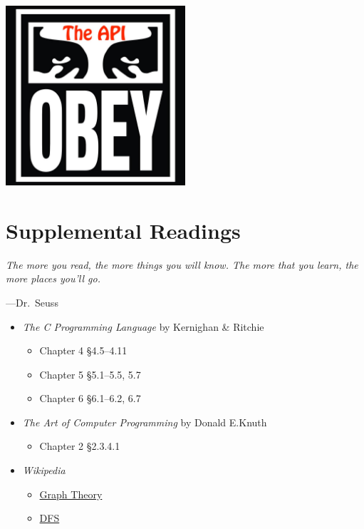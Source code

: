 \documentclass[11pt]{article}
\begin{document}
\centerline{\includegraphics[width=0.5\textwidth]{../assignment1/obey.jpg}}




\section{Supplemental Readings}
\epigraph{\emph{The more you read, the more things you will know. The
more that you learn, the more places you'll go.}}{---Dr.\ Seuss}\noindent

\begin{itemize}
    \item \textit{The C Programming Language} by Kernighan \& Ritchie
    \begin{itemize}
        \item Chapter 4 \S 4.5--4.11
	\item Chapter 5 \S 5.1--5.5, 5.7
	\item Chapter 6 \S 6.1--6.2, 6.7
    \end{itemize}

    \item \textit{The Art of Computer Programming} by Donald E.Knuth
    \begin{itemize}
        \item Chapter 2 \S 2.3.4.1
    \end{itemize}

    \item \textit{Wikipedia}
    \begin{itemize}
	\item \href{https://en.wikipedia.org/wiki/Graph_theory}{Graph Theory}
	\item \href{https://en.wikipedia.org/wiki/Depth-first_search}{DFS}
    \end{itemize}
\end{itemize}
\end{document}
